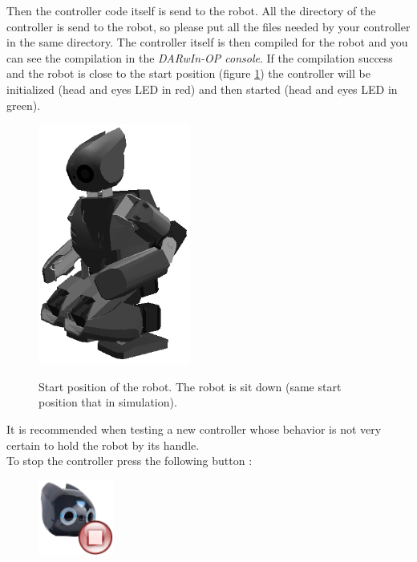 \documentclass[a4paper, 12pt]{article}  		%
\begin{document}
Then the controller code itself is send to the robot. All the directory of the controller is send to the robot, so please put all the files needed by your controller in the same directory. The controller itself is then compiled for the robot and you can see the compilation in the \textit{DARwIn-OP console}. If the compilation success and the robot is close to the start position (figure \ref{start_position}) the controller will be initialized (head and eyes LED in red) and then started (head and eyes LED in green).\\

\begin{figure}[H]
\begin{center}
\includegraphics[width=5cm]{start_position.png}
\label{start_position}
\caption{Start position of the robot. The robot is sit down (same start position that in simulation).}
\end{center}
\end{figure}

It is recommended when testing a new controller whose behavior is not very certain to hold the robot by its handle.\\

To stop the controller press the following button :
\begin{figure}[H]
\begin{center}
\includegraphics[width=2.5cm]{stop.png}
\label{stop}
\end{center}
\end{figure}
\end{document}
